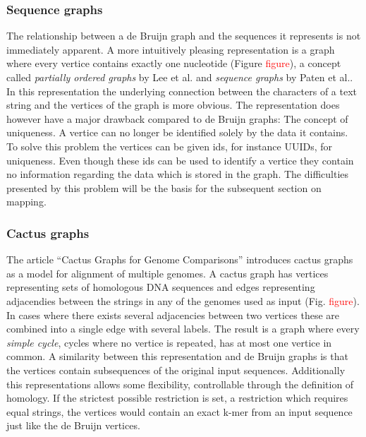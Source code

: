 \documentclass[thesis.tex]{subfiles}
\begin{document}
\subsubsection{Sequence graphs}
The relationship between a de Bruijn graph and the sequences it represents is not immediately apparent. A more intuitively pleasing representation is a graph where every vertice contains exactly one nucleotide (Figure \textcolor{red}{figure}), a concept called \textit{partially ordered graphs} by Lee et al.\cite{improved_genome_inference_in_the_mhc_using_a_population_reference_graph} and \textit{sequence graphs} by Paten et al.\cite{mapping_to_a_reference_genome_structure}. In this representation the underlying connection between the characters of a text string and the vertices of the graph is more obvious. The representation does however have a major drawback compared to de Bruijn graphs: The concept of uniqueness. A vertice can no longer be identified solely by the data it contains. To solve this problem the vertices can be given ids, for instance UUIDs\cite{mapping_to_a_reference_genome_structure}, for uniqueness. Even though these ids can be used to identify a vertice they contain no information regarding the data which is stored in the graph. The difficulties presented by this problem will be the basis for the subsequent section on mapping. 
\subsubsection{Cactus graphs}
The article ``Cactus Graphs for Genome Comparisons'' introduces cactus graphs as a model for alignment of multiple genomes. A cactus graph has vertices representing sets of homologous DNA sequences and edges representing adjacendies between the strings in any of the genomes used as input (Fig. \textcolor{red}{figure}). In cases where there exists several adjacencies between two vertices these are combined into a single edge with several labels. The result is a graph where every \textit{simple cycle}, cycles where no vertice is repeated, has at most one vertice in common. A similarity between this representation and de Bruijn graphs is that the vertices contain subsequences of the original input sequences. Additionally this representations allows some flexibility, controllable through the definition of homology. If the strictest possible restriction is set, a restriction which requires equal strings, the vertices would contain an exact k-mer from an input sequence just like the de Bruijn vertices. 
\end{document}
